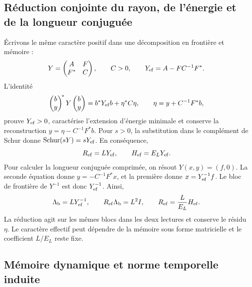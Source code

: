 \subsection{Réduction conjointe du rayon, de l'énergie et de la longueur conjuguée}

Écrivons le même caractère positif dans une décomposition en frontière
et mémoire :
\[
 Y=\begin{pmatrix}A&F\\F^*&C\end{pmatrix},\qquad C>0,
 \qquad Y_{\rm ef}=A-FC^{-1}F^*.
\]
L’identité
\[
 \begin{pmatrix}b\\y\end{pmatrix}^{\!*}Y
 \begin{pmatrix}b\\y\end{pmatrix}
 =b^*Y_{\rm ef}b+\eta^*C\eta,
 \qquad \eta=y+C^{-1}F^*b,
\]
prouve \(Y_{\rm ef}>0\), caractérise l'extension d'énergie minimale et conserve la reconstruction \(y=\eta-C^{-1}F^*b\). Pour \(s>0\), la substitution dans le complément de Schur donne \(\operatorname{Schur}(sY)=sY_{\rm ef}\). En conséquence,
\[
 R_{\rm ef}=LY_{\rm ef},\qquad
 H_{\rm ef}=E_{L}Y_{\rm ef}.
\]
Pour calculer la longueur conjuguée comprimée, on résout
\(Y(x,y)=(f,0)\). La seconde équation donne
\(y=-C^{-1}F^*x\), et la première donne
\(x=Y_{\rm ef}^{-1}f\). Le bloc de frontière de \(Y^{-1}\) est
donc \(Y_{\rm ef}^{-1}\). Ainsi,
\begin{equation}
 \Lambda_{\rm b}=LY_{\rm ef}^{-1},\qquad
 R_{\rm ef}\Lambda_{\rm b}=L^2I,\qquad
 R_{\rm ef}=\frac{L}{E_{L}}H_{\rm ef}.
 \label{g26:eq:schur-reciproco-es}
\end{equation}
La réduction agit sur les mêmes blocs dans les deux lectures et
conserve le résidu \(\eta\). Le caractère effectif peut dépendre de
la mémoire sous forme matricielle et le coefficient \(L/E_{L}\) reste fixe.

\subsection{Mémoire dynamique et norme temporelle induite}

